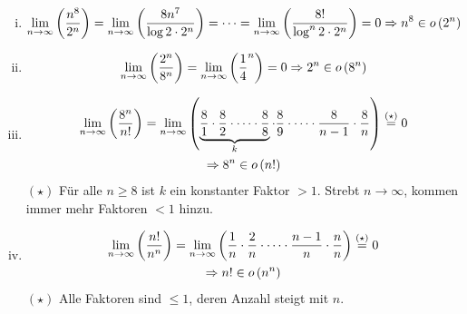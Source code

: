 \documentclass[a4paper]{scrartcl}
\begin{document}
\begin{enumerate}
\begin{enumerate}[i.]
            \item
                \begin{equation*}
                    \lim_{n \to \infty} \left( \frac{n^8}{2^n} \right)
                    = \lim_{n \to \infty} \left( \frac{8n^7}{\log 2 \cdot 2^n} \right)
                    = \cdots
                    = \lim_{n \to \infty} \left( \frac{8!}{\log^n 2 \cdot 2^n} \right)
                    = 0
                    \Rightarrow n^8 \in o \left( 2^n \right)
                \end{equation*}

            \item
                \begin{equation*}
                    \lim_{n \to \infty} \left( \frac{2^n}{8^n} \right)
                    = \lim_{n \to \infty} \left( \frac{1}{4}^n \right)
                    = 0
                    \Rightarrow 2^n \in o \left( 8^n \right)
                \end{equation*}

            \item
                \begin{equation*}
                    \begin{gathered}
                        \lim_{n \to \infty} \left( \frac{8^n}{n!} \right)
                        = \lim_{n \to \infty} \left( \underbrace{\frac{8}{1} \cdot \frac{8}{2} \cdot \cdots \cdot \frac{8}{8}}_{k} \cdot \frac{8}{9} \cdot \cdots \cdot \frac{8}{n-1} \cdot \frac{8}{n} \right)
                        \stackrel{(\star)}{=} 0 \\
                        \Rightarrow 8^n \in o \left( n! \right)
                    \end{gathered}
                \end{equation*}
                $(\star)$ Für alle $n \geq 8$ ist $k$ ein konstanter Faktor $> 1$.
                Strebt $n \to \infty$, kommen immer mehr Faktoren $< 1$ hinzu.
                

            \item
                \begin{equation*}
                    \begin{gathered}
                        \lim_{n \to \infty} \left( \frac{n!}{n^n} \right)
                        = \lim_{n \to \infty} \left( \frac{1}{n} \cdot \frac{2}{n} \cdot \cdots \cdot \frac{n-1}{n} \cdot \frac{n}{n} \right)
                            \stackrel{(\star)}{=} 0 \\
                            \Rightarrow n! \in o \left( n^n \right)
                        \end{gathered}
                \end{equation*}
                $(\star)$ Alle Faktoren sind $\leq 1$, deren Anzahl steigt mit
                $n$.


\end{enumerate}
\end{enumerate}
\end{document}
